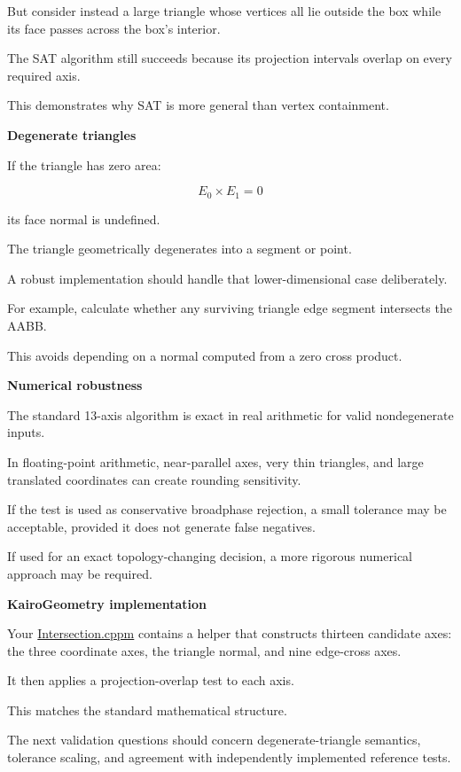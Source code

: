 But consider instead a large triangle whose vertices all lie outside the box while its face passes across the box's interior.

The SAT algorithm still succeeds because its projection intervals overlap on every required axis.

This demonstrates why SAT is more general than vertex containment.

\textbf{Degenerate triangles}

If the triangle has zero area:

\[
E_0\times E_1=0
\]

its face normal is undefined.

The triangle geometrically degenerates into a segment or point.

A robust implementation should handle that lower-dimensional case deliberately.

For example, calculate whether any surviving triangle edge segment intersects the AABB.

This avoids depending on a normal computed from a zero cross product.

\textbf{Numerical robustness}

The standard 13-axis algorithm is exact in real arithmetic for valid nondegenerate inputs.

In floating-point arithmetic, near-parallel axes, very thin triangles, and large translated coordinates can create rounding sensitivity.

If the test is used as conservative broadphase rejection, a small tolerance may be acceptable, provided it does not generate false negatives.

If used for an exact topology-changing decision, a more rigorous numerical approach may be required.

\textbf{KairoGeometry implementation}

Your \href{https://github.com/swayam8624/KairoGeometry/blob/master/Intersection.cppm?utm_source=chatgpt.com}{Intersection.cppm} contains a  helper that constructs thirteen candidate axes: the three coordinate axes, the triangle normal, and nine edge-cross axes.

It then applies a projection-overlap test to each axis.

This matches the standard mathematical structure.

The next validation questions should concern degenerate-triangle semantics, tolerance scaling, and agreement with independently implemented reference tests.

